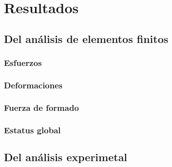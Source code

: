 \chapter{Resultados}

\section{Del análisis de elementos finitos}

\subsection{Esfuerzos}

\subsection{Deformaciones}

\subsection{Fuerza de formado}

\subsection{Estatus global}



\section{Del análisis experimetal}


